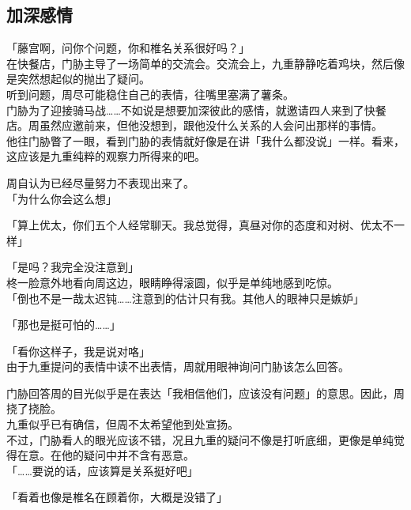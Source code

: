 \subsection{加深感情}

「藤宫啊，问你个问题，你和椎名关系很好吗？」\\

在快餐店，门胁主导了一场简单的交流会。交流会上，九重静静吃着鸡块，然后像是突然想起似的抛出了疑问。\\

听到问题，周尽可能稳住自己的表情，往嘴里塞满了薯条。\\

门胁为了迎接骑马战……不如说是想要加深彼此的感情，就邀请四人来到了快餐店。周虽然应邀前来，但他没想到，跟他没什么关系的人会问出那样的事情。\\

他往门胁瞥了一眼，看到门胁的表情就好像是在讲「我什么都没说」一样。看来，这应该是九重纯粹的观察力所得来的吧。

周自认为已经尽量努力不表现出来了。\\

「为什么你会这么想」

「算上优太，你们五个人经常聊天。我总觉得，真昼对你的态度和对树、优太不一样」

「是吗？我完全没注意到」\\

柊一脸意外地看向周这边，眼睛睁得滚圆，似乎是单纯地感到吃惊。\\

「倒也不是一哉太迟钝……注意到的估计只有我。其他人的眼神只是嫉妒」

「那也是挺可怕的……」

「看你这样子，我是说对咯」\\

由于九重提问的表情中读不出表情，周就用眼神询问门胁该怎么回答。

门胁回答周的目光似乎是在表达「我相信他们，应该没有问题」的意思。因此，周挠了挠脸。\\

九重似乎已有确信，但周不太希望他到处宣扬。\\

不过，门胁看人的眼光应该不错，况且九重的疑问不像是打听底细，更像是单纯觉得在意。在他的疑问中并不含有恶意。\\

「……要说的话，应该算是关系挺好吧」

「看着也像是椎名在顾着你，大概是没错了」

